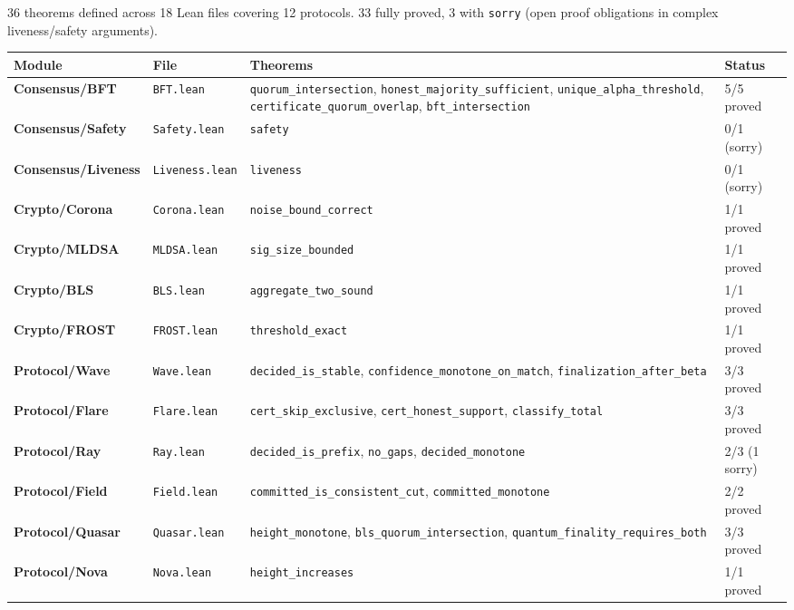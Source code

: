 \documentclass[
]{article}
\newcounter{none} %
\begin{document}
36 theorems defined across 18 Lean files covering 12 protocols. 33 fully
proved, 3 with \texttt{sorry} (open proof obligations in complex
liveness/safety arguments).

{\def\LTcaptype{none} %
\begin{longtable}[]{@{}llll@{}}
\toprule\noalign{}
Module & File & Theorems & Status \\
\midrule\noalign{}
\endhead
\bottomrule\noalign{}
\endlastfoot
\textbf{Consensus/BFT} & \texttt{BFT.lean} &
\texttt{quorum\_intersection}, \texttt{honest\_majority\_sufficient},
\texttt{unique\_alpha\_threshold},
\texttt{certificate\_quorum\_overlap}, \texttt{bft\_intersection} & 5/5
proved \\
\textbf{Consensus/Safety} & \texttt{Safety.lean} & \texttt{safety} & 0/1
(sorry) \\
\textbf{Consensus/Liveness} & \texttt{Liveness.lean} & \texttt{liveness}
& 0/1 (sorry) \\
\textbf{Crypto/Corona} & \texttt{Corona.lean} &
\texttt{noise\_bound\_correct} & 1/1 proved \\
\textbf{Crypto/MLDSA} & \texttt{MLDSA.lean} &
\texttt{sig\_size\_bounded} & 1/1 proved \\
\textbf{Crypto/BLS} & \texttt{BLS.lean} & \texttt{aggregate\_two\_sound}
& 1/1 proved \\
\textbf{Crypto/FROST} & \texttt{FROST.lean} & \texttt{threshold\_exact}
& 1/1 proved \\
\textbf{Protocol/Wave} & \texttt{Wave.lean} &
\texttt{decided\_is\_stable}, \texttt{confidence\_monotone\_on\_match},
\texttt{finalization\_after\_beta} & 3/3 proved \\
\textbf{Protocol/Flare} & \texttt{Flare.lean} &
\texttt{cert\_skip\_exclusive}, \texttt{cert\_honest\_support},
\texttt{classify\_total} & 3/3 proved \\
\textbf{Protocol/Ray} & \texttt{Ray.lean} &
\texttt{decided\_is\_prefix}, \texttt{no\_gaps},
\texttt{decided\_monotone} & 2/3 (1 sorry) \\
\textbf{Protocol/Field} & \texttt{Field.lean} &
\texttt{committed\_is\_consistent\_cut}, \texttt{committed\_monotone} &
2/2 proved \\
\textbf{Protocol/Quasar} & \texttt{Quasar.lean} &
\texttt{height\_monotone}, \texttt{bls\_quorum\_intersection},
\texttt{quantum\_finality\_requires\_both} & 3/3 proved \\
\textbf{Protocol/Nova} & \texttt{Nova.lean} & \texttt{height\_increases}
& 1/1 proved \\

\end{longtable}}
\end{document}

